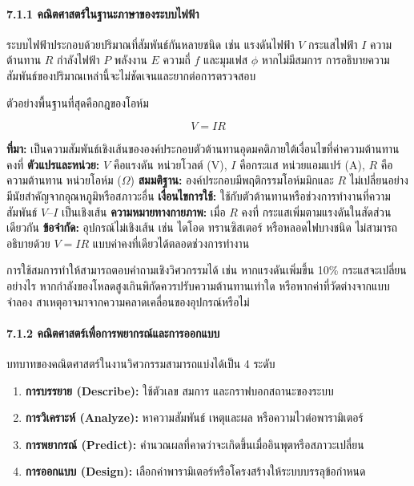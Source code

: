 \paragraph{7.1.1 คณิตศาสตร์ในฐานะภาษาของระบบไฟฟ้า}

ระบบไฟฟ้าประกอบด้วยปริมาณที่สัมพันธ์กันหลายชนิด เช่น แรงดันไฟฟ้า $V$ กระแสไฟฟ้า $I$ ความต้านทาน $R$ กำลังไฟฟ้า $P$ พลังงาน $E$ ความถี่ $f$ และมุมเฟส $\phi$ หากไม่มีสมการ การอธิบายความสัมพันธ์ของปริมาณเหล่านี้จะไม่ชัดเจนและยากต่อการตรวจสอบ

ตัวอย่างพื้นฐานที่สุดคือกฎของโอห์ม

\[
V = IR
\]

\textbf{ที่มา:} เป็นความสัมพันธ์เชิงเส้นขององค์ประกอบตัวต้านทานอุดมคติภายใต้เงื่อนไขที่ค่าความต้านทานคงที่
\textbf{ตัวแปรและหน่วย:} $V$ คือแรงดัน หน่วยโวลต์ (V), $I$ คือกระแส หน่วยแอมแปร์ (A), $R$ คือความต้านทาน หน่วยโอห์ม ($\Omega$)
\textbf{สมมติฐาน:} องค์ประกอบมีพฤติกรรมโอห์มมิกและ $R$ ไม่เปลี่ยนอย่างมีนัยสำคัญจากอุณหภูมิหรือสภาวะอื่น
\textbf{เงื่อนไขการใช้:} ใช้กับตัวต้านทานหรือช่วงการทำงานที่ความสัมพันธ์ $V$–$I$ เป็นเชิงเส้น
\textbf{ความหมายทางกายภาพ:} เมื่อ $R$ คงที่ กระแสเพิ่มตามแรงดันในสัดส่วนเดียวกัน
\textbf{ข้อจำกัด:} อุปกรณ์ไม่เชิงเส้น เช่น ไดโอด ทรานซิสเตอร์ หรือหลอดไฟบางชนิด ไม่สามารถอธิบายด้วย $V=IR$ แบบค่าคงที่เดียวได้ตลอดช่วงการทำงาน

การใช้สมการทำให้สามารถตอบคำถามเชิงวิศวกรรมได้ เช่น หากแรงดันเพิ่มขึ้น 10\% กระแสจะเปลี่ยนอย่างไร หากกำลังของโหลดสูงเกินพิกัดควรปรับความต้านทานเท่าใด หรือหากค่าที่วัดต่างจากแบบจำลอง สาเหตุอาจมาจากความคลาดเคลื่อนของอุปกรณ์หรือไม่

\paragraph{7.1.2 คณิตศาสตร์เพื่อการพยากรณ์และการออกแบบ}

บทบาทของคณิตศาสตร์ในงานวิศวกรรมสามารถแบ่งได้เป็น 4 ระดับ

\begin{enumerate}
    \item \textbf{การบรรยาย (Describe):} ใช้ตัวเลข สมการ และกราฟบอกสถานะของระบบ
    \item \textbf{การวิเคราะห์ (Analyze):} หาความสัมพันธ์ เหตุและผล หรือความไวต่อพารามิเตอร์
    \item \textbf{การพยากรณ์ (Predict):} คำนวณผลที่คาดว่าจะเกิดขึ้นเมื่ออินพุตหรือสภาวะเปลี่ยน
    \item \textbf{การออกแบบ (Design):} เลือกค่าพารามิเตอร์หรือโครงสร้างให้ระบบบรรลุข้อกำหนด
\end{enumerate}

